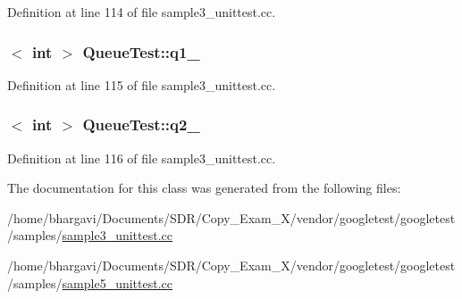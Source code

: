 Definition at line 114 of file sample3\+\_\+unittest.\+cc.

\subsubsection[{\texorpdfstring{q1\+\_\+}{q1_}}]{$<$ int $>$ Queue\+Test\+::q1\+\_\+\hspace{0.3cm}{\ttfamily [protected]}}\hypertarget{class_queue_test_a1e55594e71820ba0f1b09591fb328c30}{}\label{class_queue_test_a1e55594e71820ba0f1b09591fb328c30}


Definition at line 115 of file sample3\+\_\+unittest.\+cc.

\subsubsection[{\texorpdfstring{q2\+\_\+}{q2_}}]{$<$ int $>$ Queue\+Test\+::q2\+\_\+\hspace{0.3cm}{\ttfamily [protected]}}\hypertarget{class_queue_test_aeb7a2e3f6ce2d97d84eb1e01468adc2f}{}\label{class_queue_test_aeb7a2e3f6ce2d97d84eb1e01468adc2f}


Definition at line 116 of file sample3\+\_\+unittest.\+cc.



The documentation for this class was generated from the following files\+:\begin{DoxyCompactItemize}
\item 
/home/bhargavi/\+Documents/\+S\+D\+R/\+Copy\+\_\+\+Exam\+\_\+X/vendor/googletest/googletest/samples/\hyperlink{sample3__unittest_8cc}{sample3\+\_\+unittest.\+cc}\item 
/home/bhargavi/\+Documents/\+S\+D\+R/\+Copy\+\_\+\+Exam\+\_\+X/vendor/googletest/googletest/samples/\hyperlink{sample5__unittest_8cc}{sample5\+\_\+unittest.\+cc}\end{DoxyCompactItemize}
